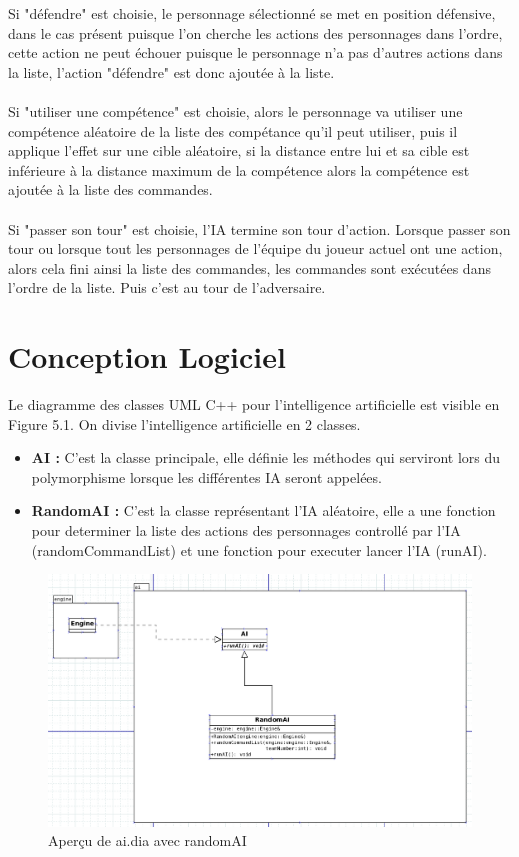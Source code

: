 Si "défendre" est choisie, le personnage sélectionné se met en 
position défensive, dans le cas présent puisque l'on cherche les 
actions des personnages dans l'ordre, cette action ne peut échouer 
puisque le personnage n'a pas d'autres actions dans la liste, 
l'action "défendre" est donc ajoutée à la liste.
\\\\
Si "utiliser une compétence" est choisie, alors le personnage va 
utiliser une compétence aléatoire de la liste des compétance qu'il 
peut utiliser, puis il applique l'effet sur une cible aléatoire, si 
la distance entre lui et sa cible est inférieure à la distance 
maximum de la compétence alors la compétence est ajoutée à la liste 
des commandes.
\\\\
Si "passer son tour" est choisie, l'IA termine son tour d’action.
Lorsque passer son tour ou lorsque tout les personnages de l'équipe 
du joueur actuel ont une action, alors cela fini ainsi la liste des 
commandes, les commandes sont exécutées dans l'ordre de la liste. 
Puis c'est au tour de l'adversaire.
\\
\section{Conception Logiciel}
Le diagramme des classes UML C++ pour l'intelligence artificielle est
visible en Figure 5.1.
On divise l'intelligence artificielle en 2 classes.

\begin{itemize}

\item \textbf{AI :} C'est la classe principale, elle définie les 
méthodes qui serviront lors du polymorphisme lorsque les différentes 
IA seront appelées.

\item \textbf{RandomAI :} C'est la classe représentant l'IA 
aléatoire, elle a une fonction pour determiner la liste des actions 
des personnages controllé par l'IA (randomCommandList) et une 
fonction pour executer lancer l'IA (runAI).



\end{itemize}

\begin{figure}[H]
\includegraphics[width=\linewidth]{images/random_ai_dia.png}
\centering
\caption{Aperçu de ai.dia avec randomAI}
\label{fig:img3}
\end{figure}
\newpage